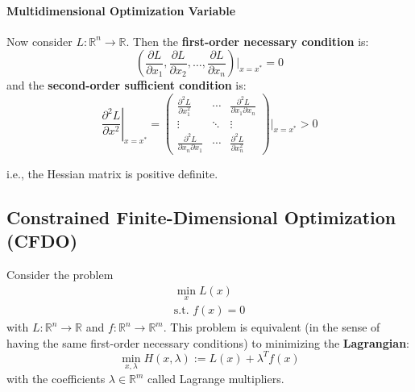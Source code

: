 \paragraph{Multidimensional Optimization Variable}

Now consider $L : \mathbb{R}^n \rightarrow \mathbb{R}$. Then the \textbf{first-order necessary condition} is:
\begin{equation*}
    \left(
    \frac{\partial L}{\partial x_1},
    \frac{\partial L}{\partial x_2},
    \dots,
    \frac{\partial L}{\partial x_n}
    \right)\Bigg|_{x = x^*} = 0
\end{equation*}
and the \textbf{second-order sufficient condition} is:
\begin{equation*}
    \left.\frac{\partial^2 L}{\partial x^2}\right|_{x = x^*} =
    \begin{pmatrix}
        \frac{\partial^2 L}{\partial x_1^2}            & \cdots & \frac{\partial^2 L}{\partial x_1 \partial x_n} \\
        \vdots                                         & \ddots & \vdots                                         \\
        \frac{\partial^2 L}{\partial x_n \partial x_1} & \cdots & \frac{\partial^2 L}{\partial x_n^2}
    \end{pmatrix}
    \Bigg|_{x = x^*} > 0
\end{equation*}

i.e., the Hessian matrix is positive definite.

\subsection{Constrained Finite-Dimensional Optimization (CFDO)}\label{CFDO}

Consider the problem
\begin{gather*}
    \min_x L(x) \\
    \text{s.t. } f(x) = 0
\end{gather*}
with $L : \mathbb{R}^n \to \mathbb{R}$ and $f : \mathbb{R}^n \to \mathbb{R}^m$. This problem is equivalent (in the sense of having the same first-order necessary conditions) to minimizing the \textbf{Lagrangian}:
\begin{equation*}
    \min_{x, \lambda} H(x, \lambda) := L(x) + \lambda^T f(x)
\end{equation*}
with the coefficients $\lambda \in \mathbb{R}^m$ called Lagrange multipliers.

\newpar{}

